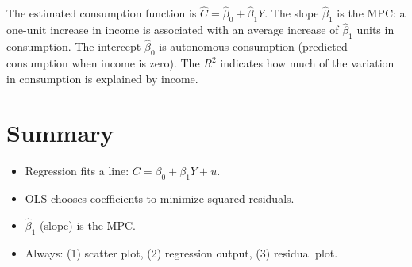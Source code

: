 \documentclass[11pt]{article}
\newcommand{\bhat}{\widehat{\beta}}
\begin{document}
\begin{tcolorbox}[colback=gray!5, colframe=black!40, title=Interpretation Template]
The estimated consumption function is $\widehat{C} = \bhat_0 + \bhat_1 Y$. The slope $\bhat_1$ is the MPC: a one-unit increase in income is associated with an average increase of $\bhat_1$ units in consumption. The intercept $\bhat_0$ is autonomous consumption (predicted consumption when income is zero). The $R^2$ indicates how much of the variation in consumption is explained by income.
\end{tcolorbox}

\section*{Summary}
\begin{itemize}
  \item Regression fits a line: $C = \beta_0 + \beta_1 Y + u$.
  \item OLS chooses coefficients to minimize squared residuals.
  \item $\bhat_1$ (slope) is the MPC.
  \item Always: (1) scatter plot, (2) regression output, (3) residual plot.
\end{itemize}
\end{document}

